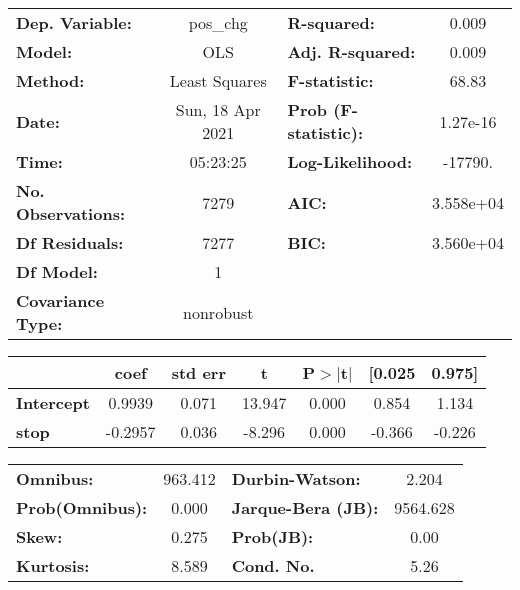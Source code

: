 \begin{center}
\begin{tabular}{lclc}
\toprule
\textbf{Dep. Variable:}    &     pos\_chg     & \textbf{  R-squared:         } &     0.009  \\
\textbf{Model:}            &       OLS        & \textbf{  Adj. R-squared:    } &     0.009  \\
\textbf{Method:}           &  Least Squares   & \textbf{  F-statistic:       } &     68.83  \\
\textbf{Date:}             & Sun, 18 Apr 2021 & \textbf{  Prob (F-statistic):} &  1.27e-16  \\
\textbf{Time:}             &     05:23:25     & \textbf{  Log-Likelihood:    } &   -17790.  \\
\textbf{No. Observations:} &        7279      & \textbf{  AIC:               } & 3.558e+04  \\
\textbf{Df Residuals:}     &        7277      & \textbf{  BIC:               } & 3.560e+04  \\
\textbf{Df Model:}         &           1      & \textbf{                     } &            \\
\textbf{Covariance Type:}  &    nonrobust     & \textbf{                     } &            \\
\bottomrule
\end{tabular}
\end{center}\begin{center}
\begin{tabular}{lcccccc}
\toprule
                   & \textbf{coef} & \textbf{std err} & \textbf{t} & \textbf{P$> |$t$|$} & \textbf{[0.025} & \textbf{0.975]}  \\
\midrule
\textbf{Intercept} &       0.9939  &        0.071     &    13.947  &         0.000        &        0.854    &        1.134     \\
\textbf{stop}      &      -0.2957  &        0.036     &    -8.296  &         0.000        &       -0.366    &       -0.226     \\
\bottomrule
\end{tabular}
\end{center}\begin{center}
\begin{tabular}{lclc}
\toprule
\textbf{Omnibus:}       & 963.412 & \textbf{  Durbin-Watson:     } &    2.204  \\
\textbf{Prob(Omnibus):} &   0.000 & \textbf{  Jarque-Bera (JB):  } & 9564.628  \\
\textbf{Skew:}          &   0.275 & \textbf{  Prob(JB):          } &     0.00  \\
\textbf{Kurtosis:}      &   8.589 & \textbf{  Cond. No.          } &     5.26  \\
\bottomrule
\end{tabular}
\end{center}